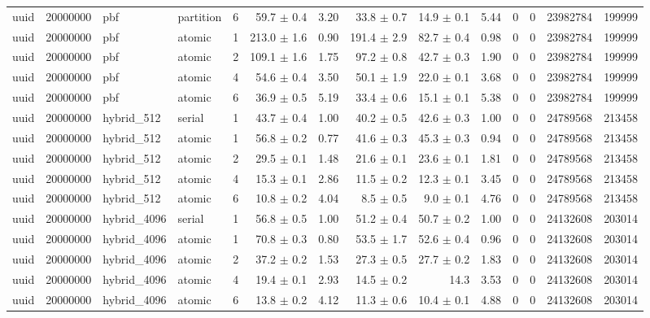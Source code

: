 \begin{tabular}{lllllrrrrrrrrr}
uuid & 20000000 & pbf & partition & 6 & 59.7 $\pm$ 0.4 & 3.20 & 33.8 $\pm$ 0.7 & 14.9 $\pm$ 0.1 & 5.44 & 0 & 0 & 23982784 & 199999 \\
uuid & 20000000 & pbf & atomic & 1 & 213.0 $\pm$ 1.6 & 0.90 & 191.4 $\pm$ 2.9 & 82.7 $\pm$ 0.4 & 0.98 & 0 & 0 & 23982784 & 199999 \\
uuid & 20000000 & pbf & atomic & 2 & 109.1 $\pm$ 1.6 & 1.75 & 97.2 $\pm$ 0.8 & 42.7 $\pm$ 0.3 & 1.90 & 0 & 0 & 23982784 & 199999 \\
uuid & 20000000 & pbf & atomic & 4 & 54.6 $\pm$ 0.4 & 3.50 & 50.1 $\pm$ 1.9 & 22.0 $\pm$ 0.1 & 3.68 & 0 & 0 & 23982784 & 199999 \\
uuid & 20000000 & pbf & atomic & 6 & 36.9 $\pm$ 0.5 & 5.19 & 33.4 $\pm$ 0.6 & 15.1 $\pm$ 0.1 & 5.38 & 0 & 0 & 23982784 & 199999 \\
uuid & 20000000 & hybrid\_512 & serial & 1 & 43.7 $\pm$ 0.4 & 1.00 & 40.2 $\pm$ 0.5 & 42.6 $\pm$ 0.3 & 1.00 & 0 & 0 & 24789568 & 213458 \\
uuid & 20000000 & hybrid\_512 & atomic & 1 & 56.8 $\pm$ 0.2 & 0.77 & 41.6 $\pm$ 0.3 & 45.3 $\pm$ 0.3 & 0.94 & 0 & 0 & 24789568 & 213458 \\
uuid & 20000000 & hybrid\_512 & atomic & 2 & 29.5 $\pm$ 0.1 & 1.48 & 21.6 $\pm$ 0.1 & 23.6 $\pm$ 0.1 & 1.81 & 0 & 0 & 24789568 & 213458 \\
uuid & 20000000 & hybrid\_512 & atomic & 4 & 15.3 $\pm$ 0.1 & 2.86 & 11.5 $\pm$ 0.2 & 12.3 $\pm$ 0.1 & 3.45 & 0 & 0 & 24789568 & 213458 \\
uuid & 20000000 & hybrid\_512 & atomic & 6 & 10.8 $\pm$ 0.2 & 4.04 & 8.5 $\pm$ 0.5 & 9.0 $\pm$ 0.1 & 4.76 & 0 & 0 & 24789568 & 213458 \\
uuid & 20000000 & hybrid\_4096 & serial & 1 & 56.8 $\pm$ 0.5 & 1.00 & 51.2 $\pm$ 0.4 & 50.7 $\pm$ 0.2 & 1.00 & 0 & 0 & 24132608 & 203014 \\
uuid & 20000000 & hybrid\_4096 & atomic & 1 & 70.8 $\pm$ 0.3 & 0.80 & 53.5 $\pm$ 1.7 & 52.6 $\pm$ 0.4 & 0.96 & 0 & 0 & 24132608 & 203014 \\
uuid & 20000000 & hybrid\_4096 & atomic & 2 & 37.2 $\pm$ 0.2 & 1.53 & 27.3 $\pm$ 0.5 & 27.7 $\pm$ 0.2 & 1.83 & 0 & 0 & 24132608 & 203014 \\
uuid & 20000000 & hybrid\_4096 & atomic & 4 & 19.4 $\pm$ 0.1 & 2.93 & 14.5 $\pm$ 0.2 & 14.3 & 3.53 & 0 & 0 & 24132608 & 203014 \\
uuid & 20000000 & hybrid\_4096 & atomic & 6 & 13.8 $\pm$ 0.2 & 4.12 & 11.3 $\pm$ 0.6 & 10.4 $\pm$ 0.1 & 4.88 & 0 & 0 & 24132608 & 203014 \\

\end{tabular}
